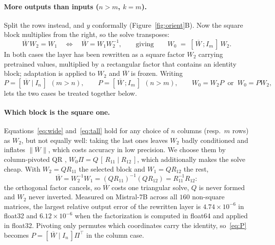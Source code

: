 \documentclass{article}
\theoremstyle{remark}
\begin{document}
\paragraph{More outputs than inputs ($n>m$, $k=m$).}
Split the rows instead, and $y$ conformally (Figure~\ref{fig:orient}B). Now the
square block multiplies from the right, so the solve transposes:
\begin{equation}
  \overline{W}\,W_2=W_1
  \quad\Longleftrightarrow\quad
  \overline{W}=W_1W_2^{-1},
  \qquad\text{giving}\qquad
  W_0 \;=\; [\,\overline{W}\,;I_m\,]\,W_2 .
  \label{eq:tall}
\end{equation}
In both cases the layer has been rewritten as a square factor $W_2$ carrying
pretrained values, multiplied by a rectangular factor that contains an identity
block; adaptation is applied to $W_2$ and $\overline{W}$ is frozen. Writing
\begin{equation}
  P=[\,\overline{W}\mid I_n\,]\ \ (m>n),
  \qquad
  P=[\,\overline{W}\,;I_m\,]\ \ (n>m),
  \qquad
  W_0=W_2P \ \text{ or } \ W_0=PW_2,
  \label{eq:P}
\end{equation}
lets the two cases be treated together below.

\paragraph{Which block is the square one.}
Equations~\eqref{eq:wide} and~\eqref{eq:tall} hold for any choice of $n$
columns (resp.\ $m$ rows) as $W_2$, but not equally well: taking the last ones
leaves $W_2$ badly conditioned and inflates $\|\overline{W}\|$, which costs
accuracy in low precision. We choose them by column-pivoted QR
\citep{businger1965pivotedqr}, $W_0\Pi=Q\,[\,R_{11}\mid R_{12}\,]$, which
additionally makes the solve cheap. With $W_2=QR_{11}$ the selected block and
$W_1=QR_{12}$ the rest,
\begin{equation}
  \overline{W}=W_2^{-1}W_1=(QR_{11})^{-1}(QR_{12})=R_{11}^{-1}R_{12}:
  \label{eq:qcancel}
\end{equation}
the orthogonal factor cancels, so $\overline{W}$ costs one triangular solve,
$Q$ is never formed and $W_2$ never inverted. Measured on Mistral-7B across all
$160$ non-square matrices, the largest relative output error of the rewritten
layer is $4.74\times 10^{-6}$ in float32 and $6.12\times 10^{-6}$ when the
factorization is computed in float64 and applied in float32. Pivoting only
permutes which coordinates carry the identity, so~\eqref{eq:P} becomes
$P=[\,\overline{W}\mid I_n\,]\Pi^{\top}$ in the column case.
\end{document}
